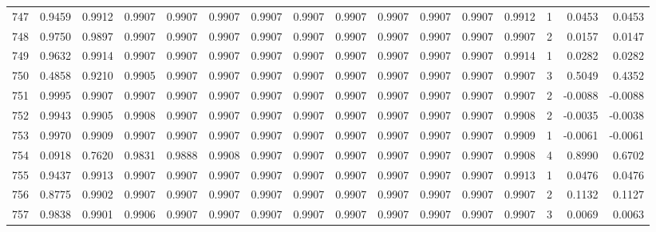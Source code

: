 \begin{tabular}{lrrrrrrrrrrrrrrr}
747 &      0.9459 &  0.9912 &  0.9907 &  0.9907 &  0.9907 &  0.9907 &  0.9907 &  0.9907 &  0.9907 &  0.9907 &   0.9907 &     0.9912 &      1 &                    0.0453 &                     0.0453 \\
748 &      0.9750 &  0.9897 &  0.9907 &  0.9907 &  0.9907 &  0.9907 &  0.9907 &  0.9907 &  0.9907 &  0.9907 &   0.9907 &     0.9907 &      2 &                    0.0157 &                     0.0147 \\
749 &      0.9632 &  0.9914 &  0.9907 &  0.9907 &  0.9907 &  0.9907 &  0.9907 &  0.9907 &  0.9907 &  0.9907 &   0.9907 &     0.9914 &      1 &                    0.0282 &                     0.0282 \\
750 &      0.4858 &  0.9210 &  0.9905 &  0.9907 &  0.9907 &  0.9907 &  0.9907 &  0.9907 &  0.9907 &  0.9907 &   0.9907 &     0.9907 &      3 &                    0.5049 &                     0.4352 \\
751 &      0.9995 &  0.9907 &  0.9907 &  0.9907 &  0.9907 &  0.9907 &  0.9907 &  0.9907 &  0.9907 &  0.9907 &   0.9907 &     0.9907 &      2 &                   -0.0088 &                    -0.0088 \\
752 &      0.9943 &  0.9905 &  0.9908 &  0.9907 &  0.9907 &  0.9907 &  0.9907 &  0.9907 &  0.9907 &  0.9907 &   0.9907 &     0.9908 &      2 &                   -0.0035 &                    -0.0038 \\
753 &      0.9970 &  0.9909 &  0.9907 &  0.9907 &  0.9907 &  0.9907 &  0.9907 &  0.9907 &  0.9907 &  0.9907 &   0.9907 &     0.9909 &      1 &                   -0.0061 &                    -0.0061 \\
754 &      0.0918 &  0.7620 &  0.9831 &  0.9888 &  0.9908 &  0.9907 &  0.9907 &  0.9907 &  0.9907 &  0.9907 &   0.9907 &     0.9908 &      4 &                    0.8990 &                     0.6702 \\
755 &      0.9437 &  0.9913 &  0.9907 &  0.9907 &  0.9907 &  0.9907 &  0.9907 &  0.9907 &  0.9907 &  0.9907 &   0.9907 &     0.9913 &      1 &                    0.0476 &                     0.0476 \\
756 &      0.8775 &  0.9902 &  0.9907 &  0.9907 &  0.9907 &  0.9907 &  0.9907 &  0.9907 &  0.9907 &  0.9907 &   0.9907 &     0.9907 &      2 &                    0.1132 &                     0.1127 \\
757 &      0.9838 &  0.9901 &  0.9906 &  0.9907 &  0.9907 &  0.9907 &  0.9907 &  0.9907 &  0.9907 &  0.9907 &   0.9907 &     0.9907 &      3 &                    0.0069 &                     0.0063 \\

\end{tabular}
